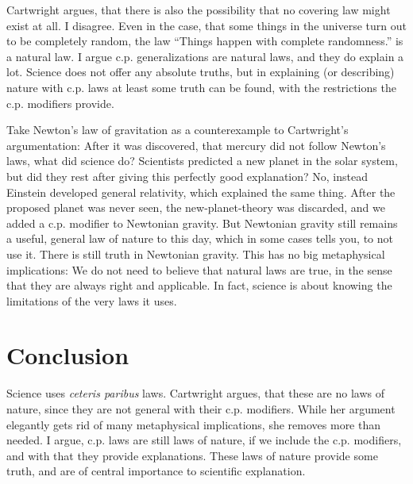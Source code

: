 Cartwright argues, that there is also the possibility that
no covering law might exist at all.
I disagree. Even in the case, that some things in the universe turn out to be
completely random, the law \enquote{Things happen with complete randomness.}
is a natural law.
I argue c.p. generalizations are natural laws, and they do explain a lot.
Science does not offer any absolute truths, but
in explaining (or describing) nature with c.p. laws at least
some truth can be found, with the restrictions the c.p. modifiers provide.

Take Newton's law of gravitation as a counterexample to Cartwright's argumentation:
After it was discovered, that mercury did not follow Newton's laws, what did
science do?
Scientists predicted a new planet in the solar system, but
did they rest after giving this perfectly good explanation?
No, instead Einstein developed general relativity, which explained the same thing.
After the proposed planet was never seen, the new-planet-theory was discarded, and
we added a c.p. modifier to Newtonian gravity.
But Newtonian gravity still remains a useful, general law of nature to this day,
which in some cases tells you, to not use it.
There is still truth in Newtonian gravity.
This has no big metaphysical implications:
We do not need to believe that natural laws are true,
in the sense that they are always right and applicable.
In fact, science is about knowing the limitations of the
very laws it uses.

\section*{Conclusion}
Science uses \emph{ceteris paribus} laws.
Cartwright argues, that these are no laws of nature,
since they are not general with their c.p. modifiers.
While her argument elegantly gets rid of many
metaphysical implications, she removes more
than needed.
I argue, c.p. laws are still laws of nature, if we include the
c.p. modifiers, and with that they provide explanations.
These laws of nature provide some truth,
and are of central importance to scientific
explanation.